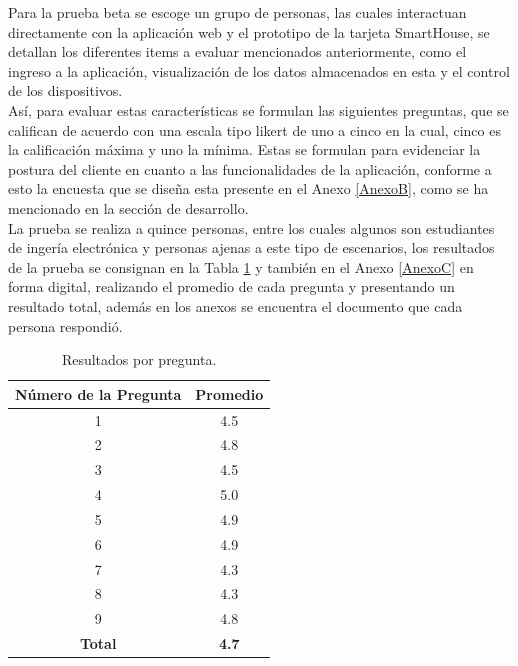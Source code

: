 Para la prueba beta se escoge un grupo de personas, las cuales interactuan directamente con la aplicación web y el prototipo de la tarjeta SmartHouse, se detallan los diferentes items a evaluar mencionados anteriormente, como el ingreso a la aplicación, visualización de los datos almacenados en esta y el control de los dispositivos.\\

Así, para evaluar estas características se formulan las siguientes preguntas, que se califican de acuerdo con una escala tipo likert \cite{lik} de uno a cinco en la cual, cinco es la calificación máxima y uno la mínima. Estas se formulan para evidenciar la postura del cliente en cuanto a las funcionalidades de la aplicación, conforme a esto la encuesta que se diseña esta presente en el Anexo \ref{AnexoB}, como se ha mencionado en la sección de desarrollo.\\

La prueba se realiza a quince personas, entre los cuales algunos son estudiantes de ingería electrónica y personas ajenas a este tipo de escenarios, los resultados de la prueba se consignan en la Tabla \ref{table:enc} y también en el Anexo \ref{AnexoC} en forma digital, realizando el promedio de cada pregunta y presentando un resultado total, además en los anexos se encuentra el documento que cada persona respondió.\\

\begin{table}[H]
	\begin{center}
		\caption{Resultados por pregunta.}
		\label{table:enc}
		\begin{tabular}{|c|c|}
			\hline 
			\textbf{Número de la Pregunta} & \textbf{Promedio} \\ 
			\hline 
			1 & 4.5\\ 
			\hline 
			2 & 4.8\\ 
			\hline 
			3 & 4.5\\ 
			\hline 
			4 & 5.0\\ 
			\hline 
			5 & 4.9\\ 
			\hline 
			6 & 4.9\\ 
			\hline 
			7 & 4.3\\ 
			\hline 
			8 & 4.3\\ 
			\hline 
			9 & 4.8\\ 
			\hline 
			\textbf{Total} & \textbf{4.7}\\ 
			\hline 
		\end{tabular} 
	\end{center}
\end{table}

